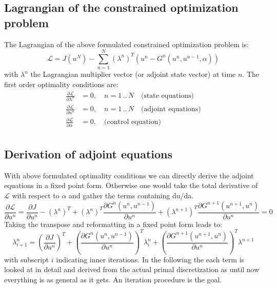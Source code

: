 \documentclass[10pt]{article}
\begin{document}
\subsection{Lagrangian of the constrained optimization problem}
The Lagrangian of the above formulated constrained optimization problem is:
\begin{equation}
\mathcal{L} = J\left( u^N \right) - \sum_{n=1}^{N} \left( \lambda^n \right)^T\left( u^n - G^n \left( u^n, u^{n-1}, \alpha \right) \right)
\end{equation}
with $\lambda^n$ the Lagrangian multiplier vector (or adjoint state vector) at time $n$. The first order optimality conditions are:
\begin{align}
\frac{\partial \mathcal{L}}{\partial \lambda^n} &= 0,\quad n= 1\,..\,N\quad\text{(state equations)}\\
\frac{\partial \mathcal{L}}{\partial u^n} &= 0,\quad n= 1\,..\,N\quad\text{(adjoint equations)}\\
\frac{\partial \mathcal{L}}{\partial \alpha} &= 0,\quad\text{(control equation)}\\
\end{align}
\subsection{Derivation of adjoint equations}
With above formulated optimality conditions we can directly derive the adjoint equations in a fixed point form. Otherwise one would take the total derivative of $\mathcal{L}$ with respect to $\alpha$ and gather the terms containing du/da.
\begin{equation}
\frac{\partial \mathcal{L}}{\partial u^n} = \frac{\partial J}{\partial u^n} - \left( \lambda^n \right)^T +\left( \lambda^n \right)^T \frac{\partial G^n \left( u^n,u^{n-1} \right)}{\partial u^n} +\left( \lambda^{n+1} \right)^T \frac{\partial G^{n+1}\left( u^{n+1},u^{n} \right)}{\partial u^n}  = 0
\end{equation}
Taking the transpose and reformatting in a fixed point form leads to:
\begin{equation}
\lambda^{n}_{i+1} = \left( \frac{\partial J}{\partial u^n} \right)^T + \left( \frac{\partial G^n\left( u^n,u^{n-1} \right)}{\partial u^n}  \right)^T \lambda^n_i  +\left( \frac{\partial G^{n+1}\left( u^{n+1},u^{n} \right)}{\partial u^n}  \right)^T \lambda^{n+1}
\end{equation}
with subscript $i$ indicating inner iterations. In the following the each term is looked at in detail and derived from the actual primal discretization as until now everything is as general as it gets. An iteration procedure is the goal. 
\end{document}
